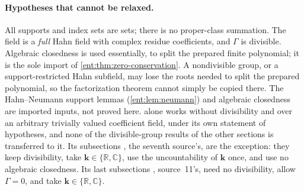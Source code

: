 \documentclass[11pt]{article}
\theoremstyle{plain}
\theoremstyle{plain}
\theoremstyle{plain}
\theoremstyle{definition}
\theoremstyle{definition}
\theoremstyle{definition}
\theoremstyle{definition}
\theoremstyle{remark}
\newcommand{\C}{\mathbb C}\newcommand{\R}{\mathbb R}
\newcommand{\kk}{\mathbf k}\newcommand{\PP}{\mathbb P}
\begin{document}
\paragraph{Hypotheses that cannot be relaxed.}
All supports and index sets are sets; there is no proper-class summation.
The field is a \emph{full} Hahn field with complex residue coefficients, and
$\Gamma$ is divisible. Algebraic closedness is used essentially, to split the
prepared finite polynomial; it is the sole import of
\cref{ent:thm:zero-conservation}. A nondivisible group, or a
support-restricted Hahn subfield, may lose the roots needed to split the
prepared polynomial, so the factorization theorem cannot simply be copied
there. The Hahn--Neumann support lemmas
(\cref{ent:lem:neumann}) and algebraic closedness \cite{Poonen} are imported
inputs, not proved here.  alone works without
divisibility and over an arbitrary trivially valued coefficient field, under
its own statement of hypotheses, and none of the divisible-group results of
the other sections is transferred to it. Its subsections
, the seventh source's,
are the exception: they keep divisibility, take $\kk\in\{\R,\C\}$, use the
uncountability of $\kk$ once, and use no algebraic closedness. Its last
subsections ,
source~11's, need no divisibility, allow $\Gamma=0$, and take
$\kk\in\{\R,\C\}$.
\end{document}
